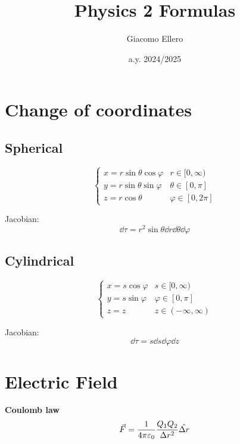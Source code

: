 \documentclass[10pt]{extarticle}
\title{Physics 2 Formulas}
\author{Giacomo Ellero}
\date{a.y. 2024/2025}
\numberwithin{equation}{section}
\begin{document}
\begin{multicols}{2}


    \section{Change of coordinates}

    \subsection{Spherical}
    \begin{equation}
        \begin{cases}
            x = r \sin \theta \cos \varphi & r \in [0, \infty)     \\
            y = r \sin \theta \sin \varphi & \theta \in [0, \pi]   \\
            z = r \cos \theta              & \varphi \in [0, 2\pi]
        \end{cases}
    \end{equation}

    Jacobian:
    \begin{equation}
        \dd{\tau} = r^2 \sin \theta \dd{r} \dd{\theta} \dd{\varphi}
    \end{equation}

    \subsection{Cylindrical}
    \begin{equation}
        \begin{cases}
            x = s \cos \varphi & s \in [0, \infty)       \\
            y = s \sin \varphi & \varphi \in [0, \pi]    \\
            z = z              & z \in (-\infty, \infty)
        \end{cases}
    \end{equation}

    Jacobian:
    \begin{equation}
        \dd{\tau} = s \dd{s} \dd{\varphi} \dd{z}
    \end{equation}

    \section{Electric Field}

    \textbf{Coulomb law}
    \begin{equation}
        \vec F = \frac{1}{4\pi \varepsilon_0} \frac{Q_1 Q_2}{\Delta r^2} \hat{\Delta r}
    \end{equation}


\end{multicols}
\end{document}
